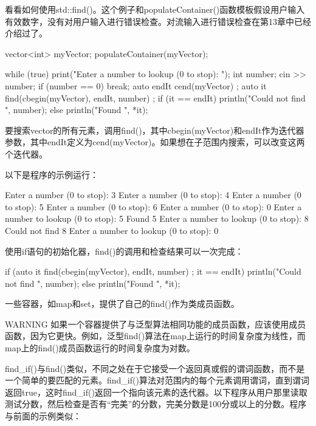 看看如何使用std::find()。这个例子和populateContainer()函数模板假设用户输入有效数字，没有对用户输入进行错误检查。对流输入进行错误检查在第13章中已经介绍过了。

\begin{cpp}
vector<int> myVector;
populateContainer(myVector);

while (true) {
    print("Enter a number to lookup (0 to stop): ");
    int number;
    cin >> number;
    if (number == 0) { break; }
    auto endIt { cend(myVector) };
    auto it { find(cbegin(myVector), endIt, number) };
    if (it == endIt) {
        println("Could not find {}", number);
    } else {
        println("Found {}", *it);
    }
}
\end{cpp}

要搜索vector的所有元素，调用find()，其中cbegin(myVector)和endIt作为迭代器参数，其中endIt定义为cend(myVector)。如果想在子范围内搜索，可以改变这两个迭代器。

以下是程序的示例运行：

\begin{shell}
Enter a number (0 to stop): 3
Enter a number (0 to stop): 4
Enter a number (0 to stop): 5
Enter a number (0 to stop): 6
Enter a number (0 to stop): 0
Enter a number to lookup (0 to stop): 5
Found 5
Enter a number to lookup (0 to stop): 8
Could not find 8
Enter a number to lookup (0 to stop): 0
\end{shell}

使用if语句的初始化器，find()的调用和检查结果可以一次完成：

\begin{cpp}
if (auto it { find(cbegin(myVector), endIt, number) }; it == endIt) {
    println("Could not find {}", number);
} else {
    println("Found {}", *it);
}
\end{cpp}

一些容器，如map和set，提供了自己的find()作为类成员函数。

\begin{myWarning}{WARNING}
如果一个容器提供了与泛型算法相同功能的成员函数，应该使用成员函数，因为它更快。例如，泛型find()算法在map上运行的时间复杂度为线性，而map上的find()成员函数运行的时间复杂度为对数。
\end{myWarning}

find\_if()与find()类似，不同之处在于它接受一个返回真或假的谓词函数，而不是一个简单的要匹配的元素。find\_if()算法对范围内的每个元素调用谓词，直到谓词返回true，这时find\_if()返回一个指向该元素的迭代器。以下程序从用户那里读取测试分数，然后检查是否有“完美”的分数，完美分数是100分或以上的分数。程序与前面的示例类似：

